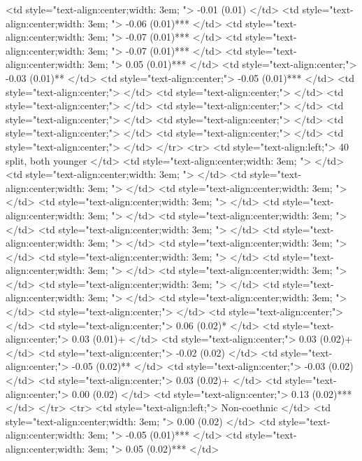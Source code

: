    <td style="text-align:center;width: 3em; "> -0.01 (0.01) </td>
   <td style="text-align:center;width: 3em; "> -0.06 (0.01)*** </td>
   <td style="text-align:center;width: 3em; "> -0.07 (0.01)*** </td>
   <td style="text-align:center;width: 3em; "> -0.07 (0.01)*** </td>
   <td style="text-align:center;width: 3em; "> 0.05 (0.01)*** </td>
   <td style="text-align:center;"> -0.03 (0.01)** </td>
   <td style="text-align:center;"> -0.05 (0.01)*** </td>
   <td style="text-align:center;">  </td>
   <td style="text-align:center;">  </td>
   <td style="text-align:center;">  </td>
   <td style="text-align:center;">  </td>
   <td style="text-align:center;">  </td>
   <td style="text-align:center;">  </td>
   <td style="text-align:center;">  </td>
   <td style="text-align:center;">  </td>
   <td style="text-align:center;">  </td>
  </tr>
  <tr>
   <td style="text-align:left;"> 40 split, both younger </td>
   <td style="text-align:center;width: 3em; ">  </td>
   <td style="text-align:center;width: 3em; ">  </td>
   <td style="text-align:center;width: 3em; ">  </td>
   <td style="text-align:center;width: 3em; ">  </td>
   <td style="text-align:center;width: 3em; ">  </td>
   <td style="text-align:center;width: 3em; ">  </td>
   <td style="text-align:center;width: 3em; ">  </td>
   <td style="text-align:center;width: 3em; ">  </td>
   <td style="text-align:center;width: 3em; ">  </td>
   <td style="text-align:center;width: 3em; ">  </td>
   <td style="text-align:center;width: 3em; ">  </td>
   <td style="text-align:center;width: 3em; ">  </td>
   <td style="text-align:center;width: 3em; ">  </td>
   <td style="text-align:center;width: 3em; ">  </td>
   <td style="text-align:center;width: 3em; ">  </td>
   <td style="text-align:center;width: 3em; ">  </td>
   <td style="text-align:center;">  </td>
   <td style="text-align:center;">  </td>
   <td style="text-align:center;"> 0.06 (0.02)* </td>
   <td style="text-align:center;"> 0.03 (0.01)+ </td>
   <td style="text-align:center;"> 0.03 (0.02)+ </td>
   <td style="text-align:center;"> -0.02 (0.02) </td>
   <td style="text-align:center;"> -0.05 (0.02)** </td>
   <td style="text-align:center;"> -0.03 (0.02) </td>
   <td style="text-align:center;"> 0.03 (0.02)+ </td>
   <td style="text-align:center;"> 0.00 (0.02) </td>
   <td style="text-align:center;"> 0.13 (0.02)*** </td>
  </tr>
  <tr>
   <td style="text-align:left;"> Non-coethnic </td>
   <td style="text-align:center;width: 3em; "> 0.00 (0.02) </td>
   <td style="text-align:center;width: 3em; "> -0.05 (0.01)*** </td>
   <td style="text-align:center;width: 3em; "> 0.05 (0.02)*** </td>
